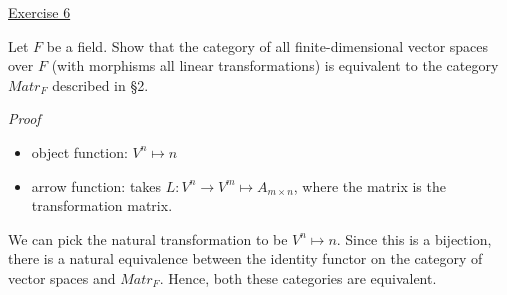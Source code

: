 \noindent
\underline{Exercise 6}
\vspace{2mm}

Let $F$ be a field. Show that the category of all finite-dimensional vector spaces
over $F$ (with morphisms all linear transformations) is equivalent to the category
$Matr_F$ described in §2.

\vspace{2mm}

\noindent
\emph{Proof}

\begin{itemize}
	\item object function: $V^n \mapsto n$
	\item arrow function: takes $L : V^n \to V^m \mapsto A_{m \times n}$, where the matrix is the transformation matrix.  
\end{itemize}

We can pick the natural transformation to be $V^n \mapsto n$. Since this is a bijection, there is a natural equivalence between the identity functor on the category of vector spaces and $Matr_F$. Hence, both these categories are equivalent.

\vspace{2mm}
